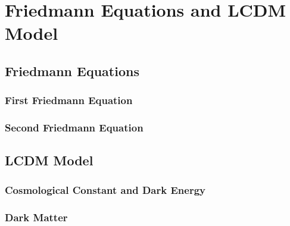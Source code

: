 \chapter{Friedmann Equations and LCDM Model}

\section{Friedmann Equations}
\subsection{First Friedmann Equation}

\subsection{Second Friedmann Equation}

\section{LCDM Model}

\subsection{Cosmological Constant and Dark Energy}

\subsection{Dark Matter}